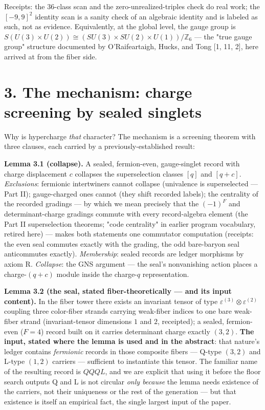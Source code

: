 \documentclass[11pt]{article}
\begin{document}
Receipts: the 36-class scan and the zero-unrealized-triples check do real work; the $[-9,9]^2$ identity scan is a sanity check of an algebraic identity and is labeled as such, not as evidence. Equivalently, at the global level, the gauge group is $S(U(3)\times U(2)) \cong (SU(3)\times SU(2)\times U(1))/\mathbb Z_6$ — the "true gauge group" structure documented by O'Raifeartaigh, Hucks, and Tong [1, 11, 2], here arrived at from the fiber side.

\section*{3. The mechanism: charge screening by sealed singlets}
Why is hypercharge \emph{that} character?  The mechanism is a screening theorem with three clauses, each carried by a previously-established result:

\textbf{Lemma 3.1 (collapse).}  A sealed, fermion-even, gauge-singlet record with charge displacement $c$ collapses the superselection classes $[q]$ and $[q + c]$.  \emph{Exclusions}: fermionic intertwiners cannot collapse (univalence is superselected — Part II); gauge-charged ones cannot (they shift recorded labels); the centrality of the recorded gradings — by which we mean precisely that the $(-1)^F$ and determinant-charge gradings commute with every record-algebra element (the Part II superselection theorems; "code centrality" in earlier program vocabulary, retired here) — makes both statements one commutator computation (receipts: the even seal commutes exactly with the grading, the odd bare-baryon seal anticommutes exactly). \emph{Membership}: sealed records are ledger morphisms by axiom R. \emph{Collapse}: the GNS argument — the seal's nonvanishing action places a charge-$(q{+}c)$ module inside the charge-$q$ representation.

\textbf{Lemma 3.2 (the seal, stated fiber-theoretically — and its input content).}  In the fiber tower there exists an invariant tensor of type $\varepsilon^{(3)} \otimes \varepsilon^{(2)}$ coupling three color-fiber strands carrying weak-fiber indices to one bare weak-fiber strand (invariant-tensor dimensions $1$ and $2$, receipted); a sealed, fermion-even ($F = 4$) record built on it carries determinant charge exactly $(3, 2)$.  \textbf{The input, stated where the lemma is used and in the abstract}: that nature's ledger contains \emph{fermionic} records in those composite fibers — Q-type $(3,2)$ and L-type $(1,2)$ carriers — sufficient to instantiate this tensor.  The familiar name of the resulting record is $QQQL$, and we are explicit that using it before the floor search outputs Q and L is not circular \emph{only because} the lemma needs existence of the carriers, not their uniqueness or the rest of the generation — but that existence is itself an empirical fact, the single largest input of the paper.
\end{document}
